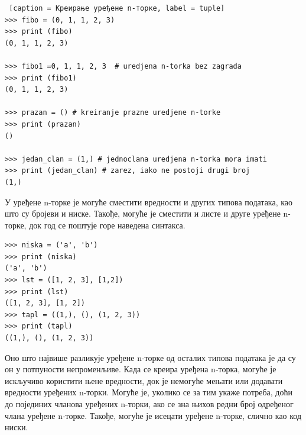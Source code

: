 \begin{lstlisting} [caption = Креирање уређене n-торке, label = tuple]
>>> fibo = (0, 1, 1, 2, 3)
>>> print (fibo)
(0, 1, 1, 2, 3)

>>> fibo1 =0, 1, 1, 2, 3  # uredjena n-torka bez zagrada
>>> print (fibo1)
(0, 1, 1, 2, 3)

>>> prazan = () # kreiranje prazne uredjene n-torke
>>> print (prazan)
()

>>> jedan_clan = (1,) # jednoclana uredjena n-torka mora imati
>>> print (jedan_clan) # zarez, iako ne postoji drugi broj
(1,)
\end{lstlisting}

У уређене n-торке је могуће сместити вредности и других типова података, као што су бројеви и ниске. Такође, могуће је сместити и листе и друге уређене n-торке, док год се поштује горе наведена синтакса.

\begin{lstlisting}[caption = Уређене n-торке могу садржати и ниске и  листе и друге уређене n-торке, label = str_lst_tuple]
>>> niska = ('a', 'b')
>>> print (niska)
('a', 'b')
>>> lst = ([1, 2, 3], [1,2])
>>> print (lst)
([1, 2, 3], [1, 2])
>>> tapl = ((1,), (), (1, 2, 3))
>>> print (tapl)
((1,), (), (1, 2, 3))
\end{lstlisting}

Оно што највише разликује уређене n-торке од осталих типова података је да су он у потпуности непроменљиве. Када се креира уређена n-торка, могуће је искључиво користити њене вредности, док је немогуће мењати или додавати вредности уређених n-торки. Могуће је, уколико се за тим укаже потреба, доћи  до појединих чланова уређених n-торки, ако се зна њихов редни број одређеног члана уређене n-торке. Такође, могуће је исецати уређене n-торке, слично као код ниски.
